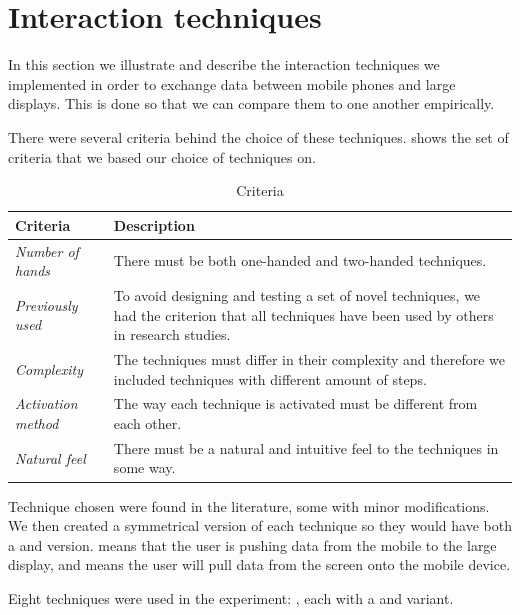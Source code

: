 \section{Interaction techniques} \label{sec:techniques}
In this section we illustrate and describe the interaction techniques we implemented in order to exchange data between mobile phones and large displays.
This is done so that we can compare them to one another empirically.

There were several criteria behind the choice of these techniques. 
 shows the set of criteria that we based our choice of techniques on.

\begin{table}[H]
	\centering
	\def\arraystretch{1.5}
	\begin{tabular}{p{} p{}}
		\hline
		\textbf{Criteria} & \textbf{Description} \\ \hline
		\textit{Number of hands} & There must be both one-handed and two-handed techniques. \\ \hline
		\textit{Previously used} & To avoid designing and testing a set of novel techniques, we had the criterion that all techniques have been used by others in research studies. \\ \hline
		\textit{Complexity} & The techniques must differ in their complexity and therefore we included techniques with different amount of steps. \\ \hline
		\textit{Activation method} & The way each technique is activated must be different from each other. \\ \hline
		\textit{Natural feel} & There must be a natural and intuitive feel to the techniques in some way. \\ \hline
	\end{tabular}
	\caption{Criteria}
	\label{tab:techniqueCriteria}
\end{table}


Technique chosen were found in the literature, some with minor modifications.
We then created a symmetrical version of each technique so they would have both a \push and \pull version.
\push means that the user is pushing data from the mobile to the large display, and \pull means the user will pull data from the screen onto the mobile device. 

Eight techniques were used in the experiment: \alltechniques, each with a \push and \pull variant.

